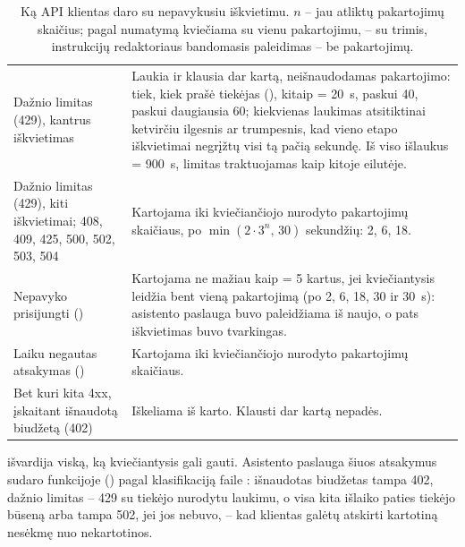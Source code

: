 \begin{table}[H]
\caption{Ką API klientas daro su nepavykusiu iškvietimu. $n$ -- jau atliktų pakartojimų
skaičius;  pagal numatymą kviečiama su vienu pakartojimu,  -- su
trimis, instrukcijų redaktoriaus bandomasis paleidimas -- be
pakartojimų.}\label{tab:models:retries}
\begin{tabularx}{\textwidth}{@{}L{44mm}Y@{}}
\toprule
{} &  \\
\midrule
Dažnio limitas (429), kantrus iškvietimas & Laukia ir klausia dar kartą, neišnaudodamas pakartojimo: tiek, kiek prašė tiekėjas (), kitaip  = 20~s, paskui 40, paskui daugiausia 60; kiekvienas laukimas atsitiktinai ketvirčiu ilgesnis ar trumpesnis, kad vieno etapo iškvietimai negrįžtų visi tą pačią sekundę. Iš viso išlaukus  = 900~s, limitas traktuojamas kaip kitoje eilutėje. \\
Dažnio limitas (429), kiti iškvietimai; 408, 409, 425, 500, 502, 503, 504 & Kartojama iki kviečiančiojo nurodyto pakartojimų skaičiaus, po $\min(2\cdot 3^{n},\,30)$ sekundžių: 2, 6, 18. \\
Nepavyko prisijungti () & Kartojama ne mažiau kaip  = 5 kartus, jei kviečiantysis leidžia bent vieną pakartojimą (po 2, 6, 18, 30 ir 30~s): asistento paslauga buvo paleidžiama iš naujo, o pats iškvietimas buvo tvarkingas. \\
Laiku negautas atsakymas () & Kartojama iki kviečiančiojo nurodyto pakartojimų skaičiaus. \\
Bet kuri kita 4xx, įskaitant išnaudotą biudžetą (402) & Iškeliama iš karto. Klausti dar kartą nepadės. \\
\bottomrule
\end{tabularx}
\end{table}

 išvardija viską, ką kviečiantysis gali gauti. Asistento paslauga šiuos
atsakymus sudaro funkcijoje  () pagal
klasifikaciją faile : išnaudotas biudžetas tampa 402, dažnio limitas
-- 429 su tiekėjo nurodytu laukimu, o visa kita išlaiko paties tiekėjo būseną arba tampa 502,
jei jos nebuvo, -- kad klientas galėtų atskirti kartotiną nesėkmę nuo nekartotinos.

